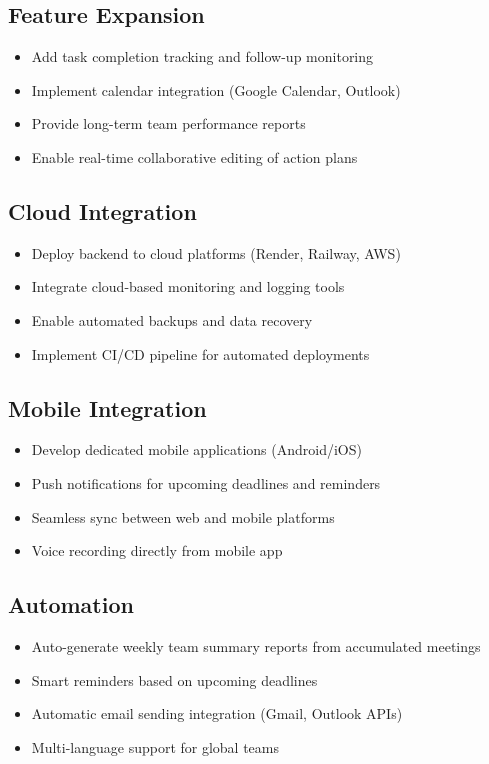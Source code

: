 \documentclass[12pt,a4paper]{article}
\begin{document}
\subsection{Feature Expansion}
\begin{itemize}
  \item Add task completion tracking and follow-up monitoring
  \item Implement calendar integration (Google Calendar, Outlook)
  \item Provide long-term team performance reports
  \item Enable real-time collaborative editing of action plans
\end{itemize}

\subsection{Cloud Integration}
\begin{itemize}
  \item Deploy backend to cloud platforms (Render, Railway, AWS)
  \item Integrate cloud-based monitoring and logging tools
  \item Enable automated backups and data recovery
  \item Implement CI/CD pipeline for automated deployments
\end{itemize}

\subsection{Mobile Integration}
\begin{itemize}
  \item Develop dedicated mobile applications (Android/iOS)
  \item Push notifications for upcoming deadlines and reminders
  \item Seamless sync between web and mobile platforms
  \item Voice recording directly from mobile app
\end{itemize}

\subsection{Automation}
\begin{itemize}
  \item Auto-generate weekly team summary reports from accumulated meetings
  \item Smart reminders based on upcoming deadlines
  \item Automatic email sending integration (Gmail, Outlook APIs)
  \item Multi-language support for global teams
\end{itemize}
\end{document}
